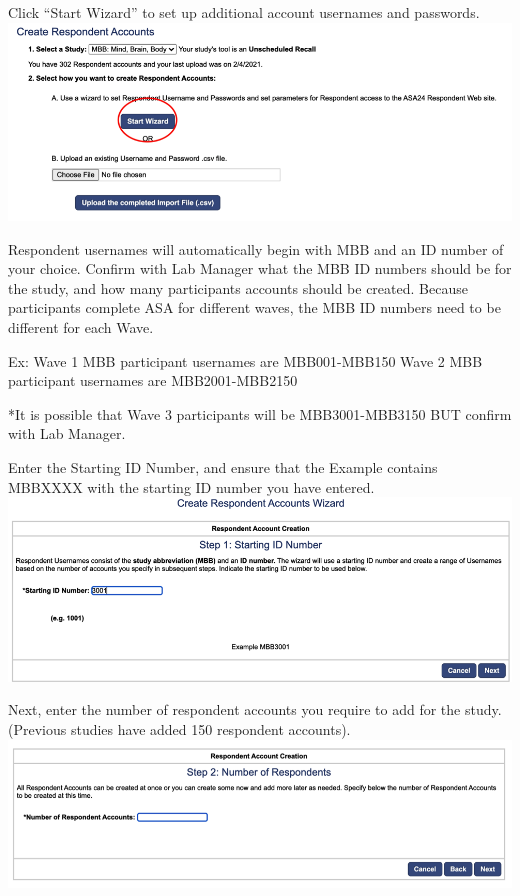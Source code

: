 \documentclass[]{book}
\begin{document}
Click ``Start Wizard'' to set up additional account usernames and passwords.
\includegraphics{images/research_protocols/asa/asa_3.png}

Respondent usernames will automatically begin with MBB and an ID number of your choice. Confirm with Lab Manager what the MBB ID numbers should be for the study, and how many participants accounts should be created. Because participants complete ASA for different waves, the MBB ID numbers need to be different for each Wave.

Ex: Wave 1 MBB participant usernames are MBB001-MBB150
Wave 2 MBB participant usernames are MBB2001-MBB2150

*It is possible that Wave 3 participants will be MBB3001-MBB3150 BUT confirm with Lab Manager.

Enter the Starting ID Number, and ensure that the Example contains MBBXXXX with the starting ID number you have entered.
\includegraphics{images/research_protocols/asa/asa_4.png}

Next, enter the number of respondent accounts you require to add for the study. (Previous studies have added 150 respondent accounts).
\includegraphics{images/research_protocols/asa/asa_5.png}
\end{document}
